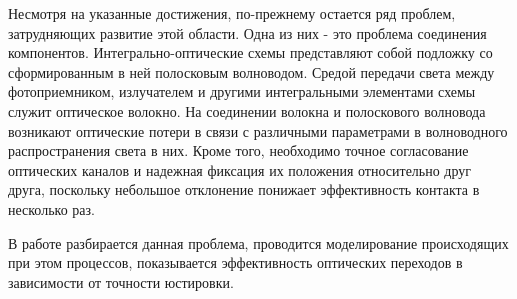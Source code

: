 Несмотря на указанные достижения, по-прежнему остается ряд проблем, затрудняющих развитие этой области. Одна из них - это проблема соединения компонентов. Интегрально-оптические схемы представляют собой подложку со сформированным в ней полосковым волноводом. Средой передачи света между фотоприемником, излучателем и другими интегральными элементами схемы служит оптическое волокно. На соединении волокна и полоскового волновода возникают оптические потери в связи с различными параметрами в волноводного  распространения света в них. Кроме того, необходимо точное согласование оптических каналов и надежная фиксация их положения относительно друг друга, поскольку небольшое отклонение понижает эффек\-тивность контакта в несколько раз. 

В работе разбирается данная проблема, проводится моделирование происходящих при этом процессов, показывается эффективность оптических переходов в зависимости от точности юстировки.